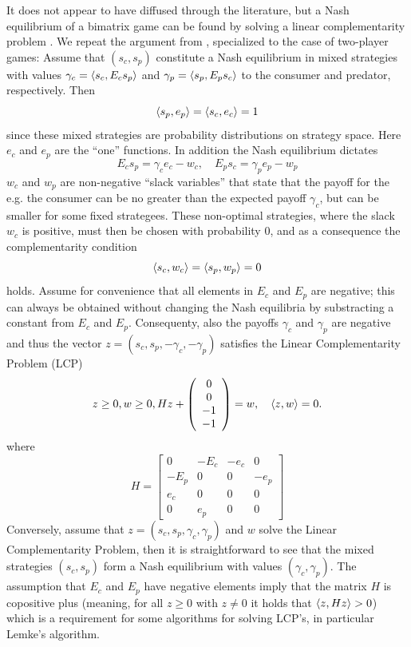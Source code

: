 It does not appear to have diffused through the literature, but a Nash equilibrium of a bimatrix game can be found by solving a linear complementarity problem \citep{miller1991copositive}. We repeat the argument from \citep{miller1991copositive}, specialized to the case of two-player games: Assume that $(s_c,s_p)$ constitute a Nash equilibrium in mixed strategies with values $\gamma_c = \left \langle s_c,E_c s_p \right \rangle$ and   $\gamma_p = \left \langle s_p,E_p s_c \right \rangle$ to the consumer and predator, respectively. Then
\[
  \left \langle s_p,e_p \right \rangle = 
  \left \langle s_c,e_c \right \rangle = 
  1
\]
since these mixed strategies are probability distributions on strategy space. Here $e_c$ and $e_p$ are the ``one'' functions. In addition the Nash equilibrium dictates
\[
  E_c s_p = \gamma_c e_c - w_c
  ,\quad
  E_p s_c = \gamma_p e_p - w_p
\]
$w_c$ and $w_p$ are non-negative ``slack variables'' that state that the payoff for the e.g. the consumer can be no greater than the expected payoff $\gamma_c$, but can be smaller for some fixed strategees. These non-optimal strategies, where the slack $w_c$ is positive, must then be chosen with probability 0, and as a consequence the complementarity condition
\[
  \left \langle s_c,w_c \right \rangle =   \left \langle s_p,w_p \right \rangle = 0 
\]
holds. Assume for convenience that all elements in $E_c$ and $E_p$ are negative; this can always be obtained without changing the Nash equilibria by substracting a constant from $E_c$ and $E_p$. Consequenty, also the payoffs $\gamma_c$ and $\gamma_p$ are negative and thus the vector $z = (s_c,s_p,-\gamma_c,-\gamma_p)$ satisfies the Linear Complementarity Problem (LCP)
\[
  z \geq 0,
  w \geq 0 ,
  H
  z
  +
  \left(
    \begin{array}{c}
      0 \\
      0 \\
      -1 \\
      -1
    \end{array}
  \right)
  =
  w
  ,
  \quad
  \left \langle z,w \right \rangle = 0
  .
\]
where
\[
  H =
  \left[
    \begin{array}{cccc}
      0 & -E_c & -e_c & 0 \\ -E_p & 0 & 0 & -e_p \\
      e_c & 0 & 0 & 0 \\
      0 & e_p & 0 & 0 
    \end{array}
  \right]
\]
Conversely, assume that $z=(s_c,s_p,\gamma_c,\gamma_p)$ and $w$ solve the Linear Complementarity Problem, then it is straightforward to see that the mixed strategies $(s_c,s_p)$ form a Nash equilibrium with values $(\gamma_c,\gamma_p)$. The assumption that $E_c$ and $E_p$ have negative elements imply that the matrix $H$ is copositive plus (meaning, for all $z\geq0$ with $z\neq0$ it holds that $\left \langle z,Hz \right \rangle>0$) which is a requirement for some algorithms for solving LCP's, in particular Lemke's algorithm.


